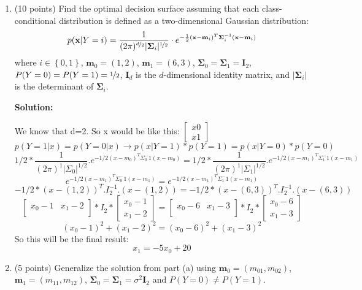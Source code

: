 \documentclass[twoside]{article}
\begin{document}
\begin{enumerate}
\item (10 points) Find the optimal decision surface assuming that each class-conditional distribution is defined as a two-dimensional Gaussian distribution:
\[
p(\mathbf{x}|Y=i)=\frac{1}{(2\pi)^{\nicefrac{d}{2}} |\mathbf{\Sigma}_{i}|^{\nicefrac{1}{2}}}\cdot e^{-\frac{1}{2}(\mathbf{x}-\mathbf{m}_{i})^{T}\mathbf{\Sigma}_{i}^{-1}(\mathbf{x}-\mathbf{m}_{i})}
\]
where $i \in \left\{ 0, 1\right\}$, $\mathbf{m}_{0}=(1,2)$, $\mathbf{m}_{1}=(6,3)$, $\mathbf{\Sigma}_{0}=\mathbf{\Sigma}_{1}=\mathbf{I}_2$, $P(Y=0)=P(Y=1)=\nicefrac{1}{2}$, $\mathbf{I}_d$ is the $d$-dimensional identity matrix, and $|\mathbf{\Sigma}_{i}|$ is the determinant of $\mathbf{\Sigma}_{i}$.


\textbf{Solution:}

We know that d=2. So x would be like this:
$\begin{bmatrix}
x0\\
x1
\end{bmatrix}$
\[
p(Y=1|x) = p(Y=0|x) \xrightarrow{} p(x|Y=1)*p(Y=1) = p(x|Y=0)*p(Y=0)
\]
\[
1/2*\frac{1}{(2\pi)^1|\Sigma_0|^{1/2}}.e^{-1/2(x-m_0)^T\Sigma_0^-1(x-m_0)} = 
1/2*\frac{1}{(2\pi)^1|\Sigma_1|^{1/2}}.e^{-1/2(x-m_1)^T\Sigma_1^-1(x-m_1)}
\]
\[
e^{-1/2(x-m_1)^T\Sigma_0^-1(x-m_1)} = e^{-1/2(x-m_1)^T\Sigma_1^-1(x-m_1)}
\]
\[
-1/2*(x-(1,2))^T.I_2^{-1}.(x-(1,2)) = -1/2*(x-(6,3))^T.I_2^{-1}.(x-(6,3))
\]
\[
\begin{bmatrix}
x_0 - 1 & x_1 - 2\\
\end{bmatrix}
* I_2 *
\begin{bmatrix}
x_0 - 1\\
x_1 - 2
\end{bmatrix}
=
\begin{bmatrix}
x_0 - 6 & x_1 - 3\\
\end{bmatrix}
* I_2 *
\begin{bmatrix}
x_0 - 6\\
x_1 - 3
\end{bmatrix}
\]
\[
(x_0 - 1)^2 + (x_1 - 2)^2 = (x_0 - 6)^2 + (x_1 - 3)^2
\]
So this will be the final result:
\[
x_1 = -5x_0 + 20
\]


\item (5 points) Generalize the solution from part (a) using $\mathbf{m}_{0}=(m_{01}, m_{02})$, $\mathbf{m}_{1}=(m_{11}, m_{12})$, $\mathbf{\Sigma}_{0}=\mathbf{\Sigma}_{1}=\sigma^2 \mathbf{I}_2$ and $P(Y=0)\neq P(Y=1)$.



\end{enumerate}
\end{document}
